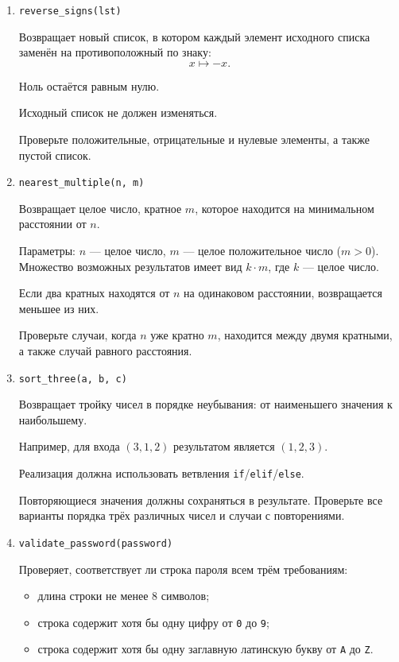 \begin{enumerate}
В сумму включаются как положительные, так и отрицательные нечётные числа.
Ноль не является нечётным и в сумму не включается.

Если нечётных элементов нет, функция возвращает $0$.

Проверьте смешанный список, список без нечётных чисел и наличие
отрицательных значений.

\item \texttt{reverse\_signs(lst)}

Возвращает новый список, в котором каждый элемент исходного списка
заменён на противоположный по знаку:
\[
x \mapsto -x.
\]

Ноль остаётся равным нулю.

Исходный список не должен изменяться.

Проверьте положительные, отрицательные и нулевые элементы, а также
пустой список.

\item \texttt{nearest\_multiple(n, m)}

Возвращает целое число, кратное $m$, которое находится на минимальном
расстоянии от $n$.

Параметры: $n$ --- целое число, $m$ --- целое положительное число
($m>0$). Множество возможных результатов имеет вид $k\cdot m$,
где $k$ --- целое число.

Если два кратных находятся от $n$ на одинаковом расстоянии, возвращается
меньшее из них.

Проверьте случаи, когда $n$ уже кратно $m$, находится между двумя
кратными, а также случай равного расстояния.

\item \texttt{sort\_three(a, b, c)}

Возвращает тройку чисел в порядке неубывания:
от наименьшего значения к наибольшему.

Например, для входа $(3,1,2)$ результатом является $(1,2,3)$.

Реализация должна использовать ветвления
\texttt{if}/\texttt{elif}/\texttt{else}.

Повторяющиеся значения должны сохраняться в результате.
Проверьте все варианты порядка трёх различных чисел и случаи
с повторениями.

\item \texttt{validate\_password(password)}

Проверяет, соответствует ли строка пароля всем трём требованиям:
\begin{itemize}
    \item длина строки не менее 8 символов;
    \item строка содержит хотя бы одну цифру от \texttt{0} до \texttt{9};
    \item строка содержит хотя бы одну заглавную латинскую букву
    от \texttt{A} до \texttt{Z}.
\end{itemize}


\end{enumerate}
